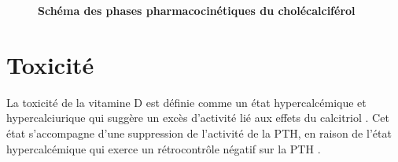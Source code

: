 \documentclass[
  a4paper,
  DIV=11,
  numbers=noendperiod,
  listof=totoc]{scrreprt}
\begin{document}
\begin{figure}


\caption[Schéma des phases pharmacocinétiques du
cholécalciférol]{\label{fig-PK-all-VitD}\textbf{Schéma des phases
pharmacocinétiques du cholécalciférol} \autocite{Schoenmakers.2018}}

\end{figure}%

\section{Toxicité}\label{toxicituxe9}

La toxicité de la vitamine D est définie comme un état hypercalcémique
et hypercalciurique qui suggère un excès d'activité lié aux effets du
calcitriol \autocite{Vieth.1990}. Cet état s'accompagne d'une
suppression de l'activité de la \ac{PTH}, en raison de l'état
hypercalcémique qui exerce un rétrocontrôle négatif sur la \ac{PTH}
\autocites[ ]{Marcinowska-Suchowierska.2018}{Dusso.2005}.
\end{document}
